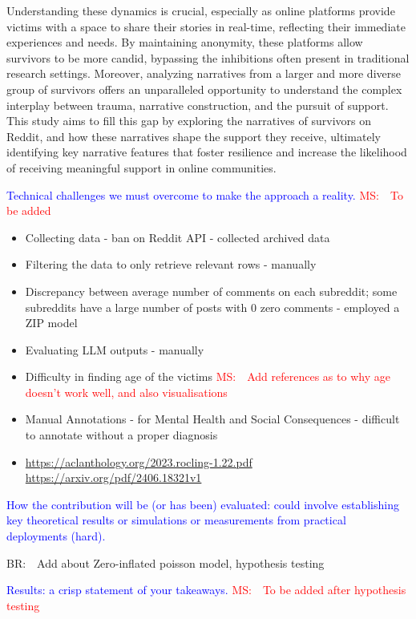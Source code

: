 \documentclass[11pt]{article}
\newcommand{\ms}[1]{\textcolor{red}{{MS:~~#1}}}
\newcommand{\br}[1]{\textcolor{red!50!yellow!80!}{{BR:~~#1}}}
\begin{document}
Understanding these dynamics is crucial, especially as online platforms provide victims with a space to share their stories in real-time, reflecting their immediate experiences and needs. 
By maintaining anonymity, these platforms allow survivors to be more candid, bypassing the inhibitions often present in traditional research settings. 
Moreover, analyzing narratives from a larger and more diverse group of survivors offers an unparalleled opportunity to understand the complex interplay between trauma, narrative construction, and the pursuit of support.
This study aims to fill this gap by exploring the narratives of survivors on Reddit, and how these narratives shape the support they receive, ultimately identifying key narrative features that foster resilience and increase the likelihood of receiving meaningful support in online communities. 

\textcolor{blue}{Technical challenges we must overcome to make the approach a reality.} \ms{To be added}

\begin{itemize}
    \item Collecting data - ban on Reddit API - collected archived data
    \item Filtering the data to only retrieve relevant rows - manually
    \item Discrepancy between average number of comments on each subreddit; some subreddits have a large number of posts with 0 zero comments - employed a ZIP model
    \item Evaluating LLM outputs - manually
    \item Difficulty in finding age of the victims
    \ms{Add references as to why age doesn't work well, and also visualisations}
    \item Manual Annotations - for Mental Health and Social Consequences - difficult to annotate without a proper diagnosis
    \item \url{https://aclanthology.org/2023.rocling-1.22.pdf} \url{https://arxiv.org/pdf/2406.18321v1}
\end{itemize}
    
\textcolor{blue}{How the contribution will be (or has been) evaluated: could involve establishing key theoretical results or simulations or measurements from practical deployments (hard).} 

\br{Add about Zero-inflated poisson model, hypothesis testing} 

\textcolor{blue}{Results: a crisp statement of your takeaways.} \ms{To be added after hypothesis testing}
\end{document}
